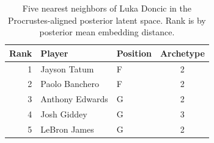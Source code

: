 \begin{table}[htbp]
  \centering\small
  \begin{tabular}{rllc}
    \toprule
    Rank & Player & Position & Archetype \\
    \midrule
    1 & Jayson Tatum & F & 2 \\
    2 & Paolo Banchero & F & 2 \\
    3 & Anthony Edwards & G & 2 \\
    4 & Josh Giddey & G & 3 \\
    5 & LeBron James & G & 2 \\
    \bottomrule
  \end{tabular}
  \caption{Five nearest neighbors of Luka Doncic in the Procrustes-aligned posterior latent space. Rank is by posterior mean embedding distance.}
  \label{tab:Luka_Doncic_neighbors}
\end{table}

